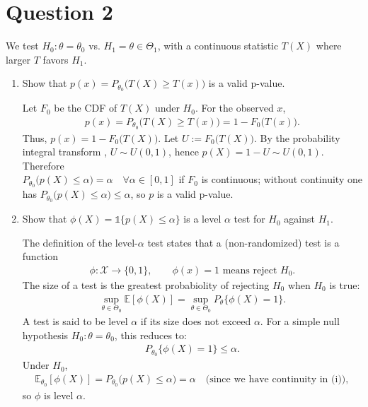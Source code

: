 \documentclass[10pt]{article}
\begin{document}
\section{Question 2}

We test $H_0: \theta = \theta_0 $ vs. $H_1 = \theta \in \Theta_1 $, with a continuous statistic $T(X) $ where larger $T $ favors $H_1 $.

\begin{enumerate}[label=(\roman*)]
    \item Show that $p(x) = P_{\theta_0}\big(T(X) \ge T(x)\big)$ is a valid p-value.
    
    Let $F_0 $ be the CDF of $T(X)$ under $H_0 $. For the observed $x $,
    \begin{gather*}
        p(x) = P_{\theta_0}\big(T(X) \ge T(x)\big) = 1 - F_0\big(T(x)\big).
    \end{gather*}
    Thus, $p(x) = 1 - F_0\big(T(X)\big)$. Let $U := F_0 \big(T(X)\big)$. By the probability integral transform \cite[Appendix B, \textsc{Theorem} 1]{appendix}, $U \sim U(0, 1)$, hence $p(X) = 1 - U \sim U(0, 1)$. Therefore \\$P_{\theta_0}\big(p(X) \le \alpha\big) = \alpha \quad\forall\alpha\in[0, 1]$ if $F_0 $ is continuous; without continuity one has $P_{\theta_0}\big(p(X) \le \alpha\big)\le \alpha $, so $p $ is a valid p-value.

    \item Show that $\phi(X) = \mathds{1}\{p(X) \le \alpha\}$ is a level $\alpha $ test for $H_0 $ against $H_1 $.
    
    The definition of the level-$\alpha $ test \cite[3.3.4: Hypothesis testing]{notes} states that a (non-randomized) test is a function 
    \begin{gather*}
        \phi: \mathcal{X} \to \{0, 1\}, \qquad \phi(x) = 1 \text{ means reject } H_0.
    \end{gather*}
    The size of a test is the greatest probabiolity of rejecting $H_0 $ when $H_0 $ is true:
    \begin{gather*}
        \sup_{\theta \in \Theta_0}\mathbb{E}[\phi(X)] = \sup_{\theta\in\Theta_0}P_\theta\{\phi(X) = 1\}.
    \end{gather*}
    A test is said to be level $\alpha$ if its size does not exceed $\alpha $. For a simple null hypothesis $H_0 : \theta = \theta_0$, this reduces to:
    \begin{gather*}
        P_{\theta_0}\{\phi(X) = 1\} \le \alpha.
    \end{gather*}
    Under $H_0$,
    \begin{gather*}
        \mathbb{E}_{\theta_0}[\phi(X)] = P_{\theta_0}\big(p(X) \le \alpha\big) = \alpha \quad\text{(since we have continuity in (i))},
    \end{gather*}
    so $\phi $ is level $\alpha $.


\end{enumerate}
\end{document}
